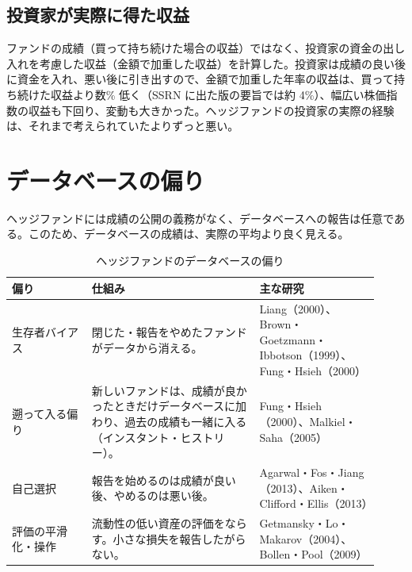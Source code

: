 \subsection{投資家が実際に得た収益}

\begin{paperbox}
ファンドの成績（買って持ち続けた場合の収益）ではなく、投資家の資金の出し入れを考慮した収益（金額で加重した収益）を計算した。投資家は成績の良い後に資金を入れ、悪い後に引き出すので、金額で加重した年率の収益は、買って持ち続けた収益より数\% 低く（SSRN に出た版の要旨では約 4\%）、幅広い株価指数の収益も下回り、変動も大きかった。ヘッジファンドの投資家の実際の経験は、それまで考えられていたよりずっと悪い。

\end{paperbox}

\section{データベースの偏り}

ヘッジファンドには成績の公開の義務がなく、データベースへの報告は任意である。このため、データベースの成績は、実際の平均より良く見える。

\begin{table}[H]
\centering\small
\caption{ヘッジファンドのデータベースの偏り}
\label{tab:hfbias}
\begin{tabular}{@{}P{0.2\linewidth}P{0.42\linewidth}P{0.3\linewidth}@{}}
\toprule
偏り & 仕組み & 主な研究 \\
\midrule
生存者バイアス & 閉じた・報告をやめたファンドがデータから消える。 & Liang（2000）\cite{liang2000}、Brown・Goetzmann・Ibbotson（1999）\cite{bgi1999}、Fung・Hsieh（2000）\cite{funghsieh2000} \\
遡って入る偏り & 新しいファンドは、成績が良かったときだけデータベースに加わり、過去の成績も一緒に入る（インスタント・ヒストリー）。 & Fung・Hsieh（2000）、Malkiel・Saha（2005）\cite{malkielsaha2005} \\
自己選択 & 報告を始めるのは成績が良い後、やめるのは悪い後。 & Agarwal・Fos・Jiang（2013）\cite{afj2013}、Aiken・Clifford・Ellis（2013）\cite{ace2013} \\
評価の平滑化・操作 & 流動性の低い資産の評価をならす。小さな損失を報告したがらない。 & Getmansky・Lo・Makarov（2004）\cite{glm2004}、Bollen・Pool（2009）\cite{bollenpool2009} \\
\bottomrule
\end{tabular}
\end{table}

